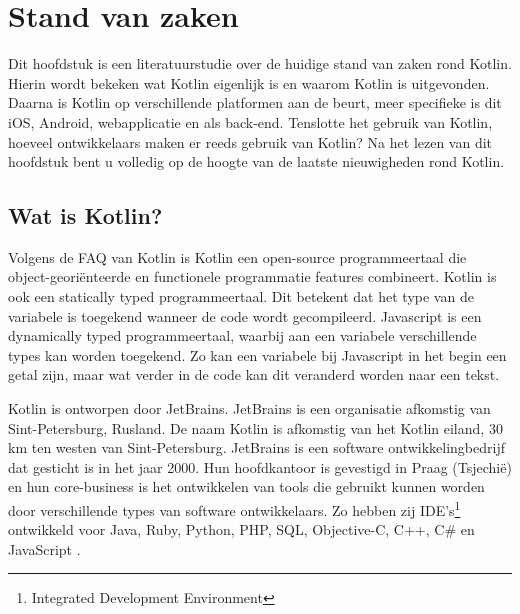 \chapter{Stand van zaken}
\label{ch:stand-van-zaken}



Dit hoofdstuk is een literatuurstudie over de huidige stand van zaken rond Kotlin. Hierin wordt bekeken wat Kotlin eigenlijk is en waarom Kotlin is uitgevonden. Daarna is Kotlin op verschillende platformen aan de beurt, meer specifieke is dit iOS, Android, webapplicatie en als back-end. Tenslotte het gebruik van Kotlin, hoeveel ontwikkelaars maken er reeds gebruik van Kotlin? Na het lezen van dit hoofdstuk bent u volledig op de hoogte van de laatste nieuwigheden rond Kotlin.

\section{Wat is Kotlin?}
\label{sec:kotlin}
Volgens de FAQ van Kotlin \autocite{JetBrainsFAQ} is Kotlin een open-source programmeertaal die object-georiënteerde en functionele programmatie features combineert. Kotlin is ook een statically typed programmeertaal. Dit betekent dat het type van de variabele is toegekend wanneer de code wordt gecompileerd. Javascript is een dynamically typed programmeertaal, waarbij aan een variabele verschillende types kan worden toegekend. Zo kan een variabele bij Javascript in het begin een getal zijn, maar wat verder in de code kan dit veranderd worden naar een tekst.

Kotlin is ontworpen door JetBrains. JetBrains is een organisatie afkomstig van Sint-Petersburg, Rusland. De naam Kotlin is afkomstig van het Kotlin eiland, 30 km ten westen van Sint-Petersburg. JetBrains is een software ontwikkelingbedrijf dat gesticht is in het jaar 2000. Hun hoofdkantoor is gevestigd in Praag (Tsjechië) en hun core-business is het ontwikkelen van tools die gebruikt kunnen worden door verschillende types van software ontwikkelaars. Zo hebben zij IDE's\footnote{Integrated Development Environment} ontwikkeld voor Java, Ruby, Python, PHP, SQL, Objective-C, C++, C\# en JavaScript \autocite{JetBrainsOverView}.

